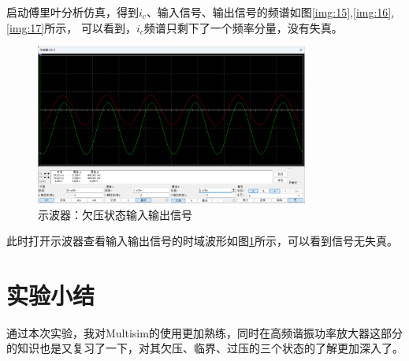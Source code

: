 \documentclass[UTF8]{ctexart}
\begin{document}
启动傅里叶分析仿真，得到$i_c$、输入信号、输出信号的频谱如图\ref{img:15},\ref{img:16},\ref{img:17}所示，
可以看到，$i_c$频谱只剩下了一个频率分量，没有失真。
\begin{figure}[htbp]
    \centering
    \includegraphics[width=0.8\textwidth]{18.png}
    \caption{示波器：欠压状态输入输出信号}
    \label{img:18}
\end{figure}
此时打开示波器查看输入输出信号的时域波形如图\ref{img:18}所示，可以看到信号无失真。
\newpage
\section{实验小结}
通过本次实验，我对Multisim的使用更加熟练，同时在高频谐振功率放大器这部分的知识也是又复习了一下，对其欠压、临界、过压的三个状态的了解更加深入了。
\end{document}
